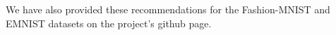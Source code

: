 We have also provided these recommendations for the Fashion-MNIST and EMNIST datasets on the project's github page.
